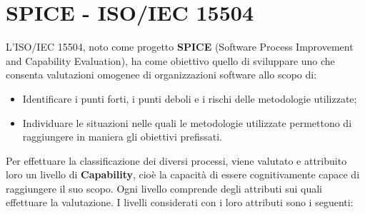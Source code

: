 \appendix
\section{SPICE - ISO/IEC 15504}  \label{spice}
L'ISO/IEC 15504, noto come progetto \textbf{SPICE} (Software Process Improvement and Capability Evaluation), ha come obiettivo quello di sviluppare uno  che consenta valutazioni omogenee di organizzazioni software allo scopo di:
\begin{itemize}
	\item Identificare i punti forti, i punti deboli e i rischi delle metodologie utilizzate;
	\item Individuare le situazioni nelle quali le metodologie utilizzate permettono di raggiungere in maniera  gli obiettivi prefissati.
\end{itemize}
Per effettuare la classificazione dei diversi processi, viene valutato e attribuito loro un livello di \textbf{Capability}, cioè la capacità di essere cognitivamente capace di raggiungere il suo scopo.
Ogni livello comprende degli attributi sui quali effettuare la valutazione.
I livelli considerati con i loro attributi sono i seguenti:
